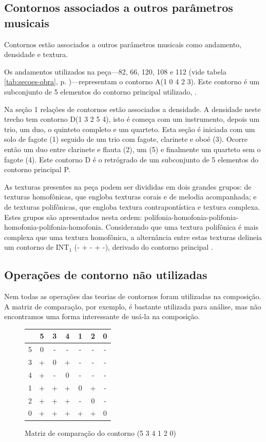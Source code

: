 
\subsection{Contornos associados a outros parâmetros musicais}
\label{sec:cont-assoc-outr}

Contornos estão associados a outros parâmetros musicais como
andamento, densidade e textura.

Os andamentos utilizados na peça---82, 66, 120, 108 e 112 (vide tabela
\ref{tab:secoes-obra}, p. \pageref{tab:secoes-obra})---representam o
contorno A(1 0 4 2 3). Este contorno é um subconjunto de 5 elementos
do contorno principal utilizado, \contpr{}.

Na seção 1 relações de contornos estão associados a densidade. A
densidade neste trecho tem contorno D(1 3 2 5 4), isto é começa com um
instrumento, depois um trio, um duo, o quinteto completo e um
quarteto. Esta seção é iniciada com um solo de fagote (1) seguido de
um trio com fagote, clarinete e oboé (3). Ocorre então um duo entre
clarinete e flauta (2), um  (5) e finalmente um quarteto
sem o fagote (4). Este contorno D é o retrógrado de um subconjunto de
5 elementos do contorno principal P.

As texturas presentes na peça podem ser divididas em dois grandes
grupos: de texturas homofônicas, que engloba texturas corais e de
melodia acompanhada; e de texturas polifônicas, que engloba textura
contrapontística e textura complexa. Estes grupos são apresentados
nesta ordem:
polifonia-homofonia-polifonia-homofonia-polifonia-homofonia. Considerando
que uma textura polifônica é mais complexa que uma textura homofônica,
a alternância entre estas texturas delineia um contorno de INT$_1$ (-
+ - + -), derivado do contorno principal \contpr{}.

\subsection{Operações de contorno não utilizadas}
\label{sec:oper-de-cont}

Nem todas as operações das teorias de contornos foram utilizadas na
composição. A matriz de comparação, por exemplo, é bastante utilizada para
análise, mas não encontramos uma forma interessante de usá-la na
composição.

\begin{figure}
  \centering
  \begin{tabular}{r|cccccc}
      & 5 & 3 & 4 & 1 & 2 & 0 \\
      \hline
    5 & 0 & - & - & - & - & - \\
    3 & + & 0 & + & - & - & - \\
    4 & + & - & 0 & - & - & - \\
    1 & + & + & + & 0 & + & - \\
    2 & + & + & + & - & 0 & - \\
    0 & + & + & + & + & + & 0
  \end{tabular}
  \caption{Matriz de comparação do contorno (5 3 4 1 2 0)}
  \label{fig:matriz-534120}
\end{figure}


